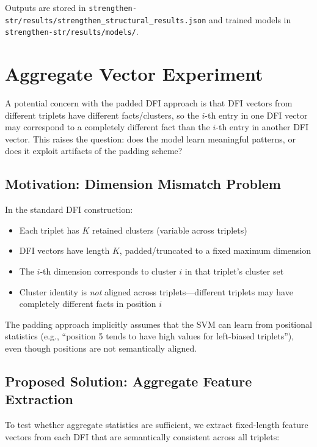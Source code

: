 \documentclass[12pt,a4paper]{article}
\begin{document}
Outputs are stored in \texttt{strengthen-str/results/strengthen\_structural\_results.json}
and trained models in \texttt{strengthen-str/results/models/}.

\section{Aggregate Vector Experiment}

A potential concern with the padded DFI approach is that DFI vectors from different triplets
have different facts/clusters, so the $i$-th entry in one DFI vector may correspond to a
completely different fact than the $i$-th entry in another DFI vector.
This raises the question: does the model learn meaningful patterns, or does it exploit
artifacts of the padding scheme?

\subsection{Motivation: Dimension Mismatch Problem}

In the standard DFI construction:
\begin{itemize}
\item Each triplet has $K$ retained clusters (variable across triplets)
\item DFI vectors have length $K$, padded/truncated to a fixed maximum dimension
\item The $i$-th dimension corresponds to cluster $i$ in that triplet's cluster set
\item Cluster identity is \textit{not} aligned across triplets---different triplets may have
      completely different facts in position $i$
\end{itemize}

The padding approach implicitly assumes that the SVM can learn from positional statistics
(e.g., ``position 5 tends to have high values for left-biased triplets''), even though
positions are not semantically aligned.

\subsection{Proposed Solution: Aggregate Feature Extraction}

To test whether aggregate statistics are sufficient, we extract fixed-length feature vectors
from each DFI that are semantically consistent across all triplets:
\end{document}
